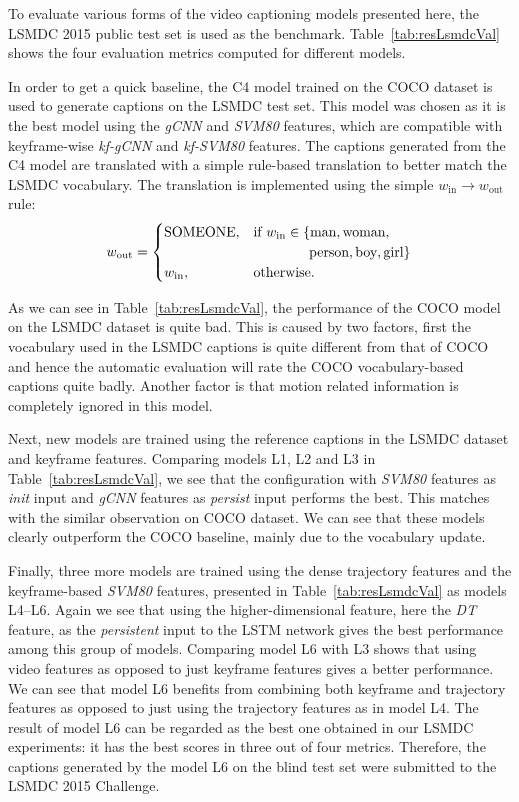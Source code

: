 To evaluate various forms of the video captioning models presented here,
the LSMDC 2015 public test set is used as the benchmark. 
Table~\ref{tab:resLsmdcVal} shows the four evaluation metrics computed for different
models.

In order to get a quick baseline, the C4 model trained on the COCO
dataset is used to generate captions on the LSMDC test set.
This model was chosen as it is the best model using the \emph{gCNN} and
\emph{SVM80} features, which are compatible with keyframe-wise \emph{kf-gCNN}
and \emph{kf-SVM80} features.
The captions generated from the C4 model are translated with a simple
rule-based translation to better match the LSMDC vocabulary.
The translation is implemented using the simple %
$w_{\text{in}} \longrightarrow w_{\text{out}}$ rule:
\begin{align} \label{eqTrans} w_{\text{out}} = \begin{cases} \text{SOMEONE},&
\text{if } w_{\text{in}} \in \{\text{man}, \text{woman}, \\&
\text{\mbox{\qquad\qquad person}}, \text{boy}, \text{girl} \}\\ w_{\text{in}},&
\text{otherwise.} \end{cases} \end{align}

As we can see in Table~\ref{tab:resLsmdcVal}, the performance of the COCO model
on the LSMDC dataset is quite bad.
This is caused by two factors, first the vocabulary used in the LSMDC captions is
quite different from that of COCO and hence the automatic evaluation will rate the
COCO vocabulary-based captions quite badly.
Another factor is that motion related information is completely ignored in this
model.

Next, new models are trained using the reference captions in the LSMDC dataset and
keyframe features.
Comparing models L1, L2 and L3 in Table~\ref{tab:resLsmdcVal}, we see that the
configuration with \emph{SVM80} features as \emph{init} input and \emph{gCNN}
features as \emph{persist} input performs the best.
This matches with the similar observation on COCO dataset.
We can see that these models clearly outperform the COCO baseline, mainly
due to the vocabulary update.

Finally, three more models are trained using the dense trajectory features and the
keyframe-based \emph{SVM80} features, presented in Table~\ref{tab:resLsmdcVal}
as models L4--L6. 
Again we see that using the higher-dimensional feature, here the \emph{DT}
feature, as the \emph{persistent} input to the LSTM network gives the best
performance among this group of models.
Comparing model L6 with L3 shows that using video features as opposed to just
keyframe features gives a better performance.
We can see that model L6 benefits from combining both keyframe and trajectory
features as opposed to just using the trajectory features as in model L4.
The result of model L6 can be regarded as the best one obtained in our LSMDC
experiments: it has the best scores in three out of four metrics.
Therefore, the captions generated by the model L6 on the blind test set were
submitted to the LSMDC 2015 Challenge.

